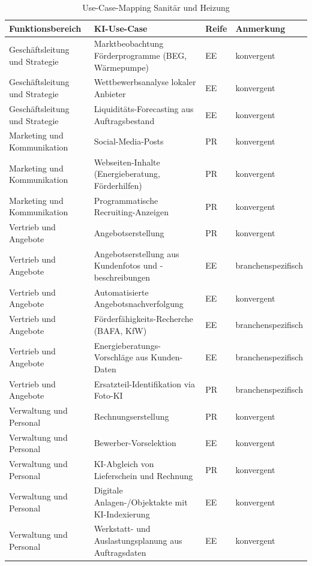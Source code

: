 \documentclass[a4paper,11pt]{article}
\begin{document}
\begin{table}[H]
\centering
\caption{Use-Case-Mapping Sanitär und Heizung}
\label{tab:mapping_shk}
\small
\begin{tabular}{p{2.8cm}p{6.5cm}p{0.8cm}p{3.5cm}}
\toprule
\textbf{Funktionsbereich} & \textbf{KI-Use-Case} & \textbf{Reife} & \textbf{Anmerkung} \\
\midrule
Geschäftsleitung und Strategie & Marktbeobachtung Förderprogramme (BEG, Wärmepumpe) & EE & konvergent \\
Geschäftsleitung und Strategie & Wettbewerbsanalyse lokaler Anbieter & EE & konvergent \\
Geschäftsleitung und Strategie & Liquiditäts-Forecasting aus Auftragsbestand & EE & konvergent \\
Marketing und Kommunikation & Social-Media-Posts & PR & konvergent \\
Marketing und Kommunikation & Webseiten-Inhalte (Energieberatung, Förderhilfen) & PR & konvergent \\
Marketing und Kommunikation & Programmatische Recruiting-Anzeigen & PR & konvergent \\
Vertrieb und Angebote & Angebotserstellung & PR & konvergent \\
Vertrieb und Angebote & Angebotserstellung aus Kundenfotos und -beschreibungen & EE & branchenspezifisch \\
Vertrieb und Angebote & Automatisierte Angebotsnachverfolgung & EE & konvergent \\
Vertrieb und Angebote & Förderfähigkeits-Recherche (BAFA, KfW) & EE & branchenspezifisch \\
Vertrieb und Angebote & Energieberatungs-Vorschläge aus Kunden-Daten & EE & branchenspezifisch \\
Vertrieb und Angebote & Ersatzteil-Identifikation via Foto-KI & PR & branchenspezifisch \\
Verwaltung und Personal & Rechnungserstellung & PR & konvergent \\
Verwaltung und Personal & Bewerber-Vorselektion & EE & konvergent \\
Verwaltung und Personal & KI-Abgleich von Lieferschein und Rechnung & PR & konvergent \\
Verwaltung und Personal & Digitale Anlagen-/Objektakte mit KI-Indexierung & EE & konvergent \\
Verwaltung und Personal & Werkstatt- und Auslastungsplanung aus Auftragsdaten & EE & konvergent \\

\end{tabular}
\end{table}
\end{document}
